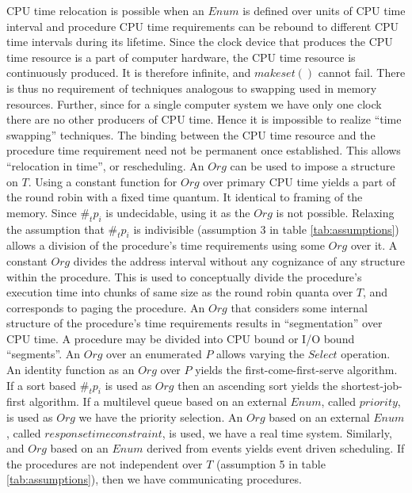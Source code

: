 \documentclass[draft]{article}
\begin{document}
CPU time relocation  is possible when an $Enum$  is defined over units
of  CPU time  interval  and  procedure CPU  time  requirements can  be
rebound to  different CPU time  intervals during its  lifetime.  Since
the clock  device that  produces the  CPU time resource  is a  part of
computer hardware, the CPU time resource is continuously produced.  It
is therefore infinite, and $makeset()$  cannot fail.  There is thus no
requirement  of  techniques  analogous  to  swapping  used  in  memory
resources.  Further, since  for a single computer system  we have only
one  clock there  are no  other producers  of CPU  time.  Hence  it is
impossible  to  realize  ``time  swapping'' techniques.   The  binding
between the CPU time resource  and the procedure time requirement need
not  be  permanent  once  established.  This  allows  ``relocation  in
time'', or rescheduling.   An $Org$ can be used  to impose a structure
on $T$.   Using a  constant function for  $Org$ over primary  CPU time
yields  a part  of the  round  robin with  a fixed  time quantum.   It
identical to  framing of the memory.  Since  $\#_tp_i$ is undecidable,
using it as  the $Org$ is not possible.   Relaxing the assumption that
$\#_tp_i$ is indivisible (assumption 3 in table \ref{tab:assumptions})
allows  a division  of the  procedure's time  requirements  using some
$Org$ over it.  A constant  $Org$ divides the address interval without
any cognizance of any structure within the procedure.  This is used to
conceptually divide the procedure's execution time into chunks of same
size as the round robin quanta over $T$, and corresponds to paging the
procedure.   An $Org$ that  considers some  internal structure  of the
procedure's  time requirements  results in  ``segmentation''  over CPU
time.   A  procedure  may be  divided  into  CPU  bound or  I/O  bound
``segments''.   An $Org$  over an  enumerated $P$  allows  varying the
$Select$ operation.  An identity function  as an $Org$ over $P$ yields
the first-come-first-serve  algorithm.  If  a sort based  $\#_tp_i$ is
used  as $Org$ then  an ascending  sort yields  the shortest-job-first
algorithm.  If a multilevel queue  based on an external $Enum$, called
$priority$, is used as $Org$ we have the priority selection.  An $Org$
based  on an external  $Enum$, called  $response time  constraint$, is
used, we  have a real time  system.  Similarly, and $Org$  based on an
$Enum$  derived from events  yields event  driven scheduling.   If the
procedures  are  not  independent  over  $T$ (assumption  5  in  table
\ref{tab:assumptions}),   then  we   have   communicating  procedures.
\end{document}
